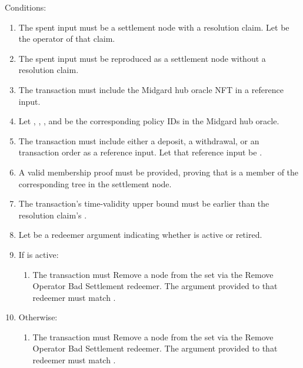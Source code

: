 \documentclass[../midgard.tex]{subfiles}
\begin{document}
\begin{description}
    Conditions:
      \begin{enumerate}
        \item The spent input must be a settlement node with a resolution claim.
          Let  be the operator of that claim.
        \item The spent input must be reproduced as a settlement node without a resolution claim.
        \item The transaction must include the Midgard hub oracle NFT in a reference input.
        \item Let , , , and  be the corresponding policy IDs in the Midgard hub oracle.
        \item The transaction must include either a deposit, a withdrawal, or an transaction order as a reference input.
          Let that reference input be .
        \item A valid membership proof must be provided, proving that  is a member of the corresponding tree in the settlement node.
        \item The transaction's time-validity upper bound must be earlier than the resolution claim's .
        \item Let  be a redeemer argument indicating whether  is active or retired.
        \item If  is active:
            \begin{enumerate}
                \item The transaction must Remove a node from the  set via the Remove Operator Bad Settlement redeemer.
                  The  argument provided to that redeemer must match .
            \end{enumerate}
        \item Otherwise:
            \begin{enumerate}
                \item The transaction must Remove a node from the  set via the Remove Operator Bad Settlement redeemer.
                  The  argument provided to that redeemer must match .
            \end{enumerate}
      \end{enumerate}
\end{description}
\end{document}
